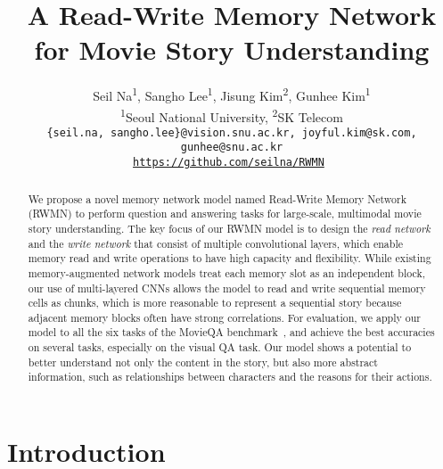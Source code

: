 \documentclass[10pt,twocolumn,letterpaper]{article}
\theoremstyle{nonumberplain}
\newcommand*{\affaddr}[1]{#1} \newcommand*{\affmark}[1][*]{\textsuperscript{#1}}
\begin{document}
\title{A Read-Write Memory Network for Movie Story Understanding}

\author{Seil Na\affmark[1], Sangho Lee\affmark[1], Jisung Kim\affmark[2], Gunhee Kim\affmark[1] \\
\affaddr{\affmark[1]Seoul National University, \affmark[2]SK Telecom}\\
{\tt\small \{seil.na, sangho.lee\}@vision.snu.ac.kr, joyful.kim@sk.com, gunhee@snu.ac.kr} \\
\tt\small \url{https://github.com/seilna/RWMN}
}

\maketitle

\begin{abstract}

We propose a novel memory network model named Read-Write Memory Network (RWMN)  to perform question and answering  tasks for large-scale, multimodal movie story understanding.
The key focus of our RWMN model is to design the \textit{read network} and the \textit{write network} that consist of multiple convolutional layers, 
which enable memory read and write operations to have high capacity and flexibility. 
While existing memory-augmented network models treat each memory slot as an independent block,
our use of multi-layered CNNs allows the model to read and write sequential memory cells as chunks,
which is more reasonable to represent a sequential story because adjacent memory blocks often have strong correlations. 
For evaluation, we apply our model to all the six tasks of the MovieQA benchmark~\cite{tapaswi2016movieqa}, and achieve the best accuracies on several tasks, especially on the visual QA task.
Our model shows a potential to better understand not only the content in the story, but also more abstract information, such as relationships between characters and the reasons for their actions. 
\end{abstract}

\section{Introduction}
\end{document}
